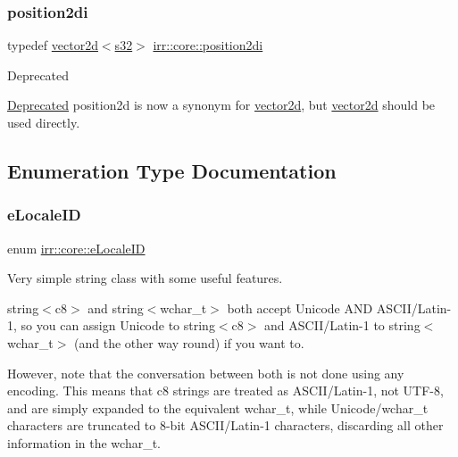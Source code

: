 \subsubsection{\texorpdfstring{position2di}{position2di}}
{\footnotesize\ttfamily typedef \hyperlink{classirr_1_1core_1_1vector2d}{vector2d}$<$\hyperlink{namespaceirr_ac66849b7a6ed16e30ebede579f9b47c6}{s32}$>$ \hyperlink{namespaceirr_1_1core_a3643c2cc7820dd78cd87e73a46b92145}{irr\+::core\+::position2di}}

\begin{DoxyRefDesc}{Deprecated}
\item[\hyperlink{deprecated__deprecated000026}{Deprecated}]position2d is now a synonym for \hyperlink{classirr_1_1core_1_1vector2d}{vector2d}, but \hyperlink{classirr_1_1core_1_1vector2d}{vector2d} should be used directly. \end{DoxyRefDesc}


\subsection{Enumeration Type Documentation}
\mbox{\label{namespaceirr_1_1core_a4682709540c80568b555acc36dbf3a4a}} 
\subsubsection{\texorpdfstring{e\+Locale\+ID}{eLocaleID}}
{\footnotesize\ttfamily enum \hyperlink{namespaceirr_1_1core_a4682709540c80568b555acc36dbf3a4a}{irr\+::core\+::e\+Locale\+ID}}



Very simple string class with some useful features. 

string$<$c8$>$ and string$<$wchar\+\_\+t$>$ both accept Unicode A\+ND A\+S\+C\+I\+I/\+Latin-\/1, so you can assign Unicode to string$<$c8$>$ and A\+S\+C\+I\+I/\+Latin-\/1 to string$<$wchar\+\_\+t$>$ (and the other way round) if you want to.

However, note that the conversation between both is not done using any encoding. This means that c8 strings are treated as A\+S\+C\+I\+I/\+Latin-\/1, not U\+T\+F-\/8, and are simply expanded to the equivalent wchar\+\_\+t, while Unicode/wchar\+\_\+t characters are truncated to 8-\/bit A\+S\+C\+I\+I/\+Latin-\/1 characters, discarding all other information in the wchar\+\_\+t. 

